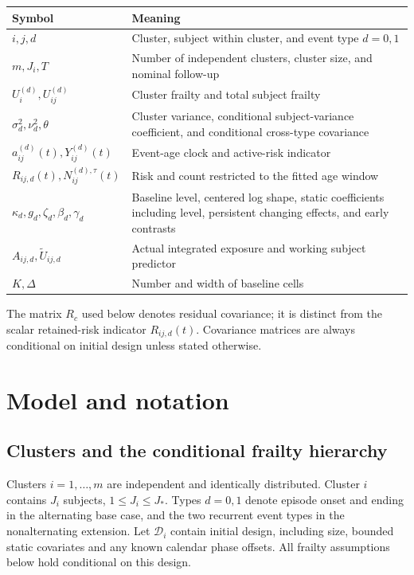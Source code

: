 \documentclass[11pt]{article}
\begin{document}
{\footnotesize\setlength{\tabcolsep}{4pt}
\begin{longtable}{P{95pt}P{357pt}}
\toprule
\textbf{Symbol} & \textbf{Meaning} \\
\midrule
\endhead
\bottomrule
\endlastfoot
\(i,j,d\) & Cluster, subject within cluster, and event type \(d=0,1\) \\
\(m,J_i,T\) & Number of independent clusters, cluster size, and nominal follow-up \\
\(U_i^{(d)},U_{ij}^{(d)}\) & Cluster frailty and total subject frailty \\
\(\sigma_d^2,\nu_d^2,\theta\) & Cluster variance, conditional subject-variance coefficient, and conditional cross-type covariance \\
\(a_{ij}^{(d)}(t),Y_{ij}^{(d)}(t)\) & Event-age clock and active-risk indicator \\
\(R_{ij,d}(t),N_{ij}^{(d),\tau}(t)\) & Risk and count restricted to the fitted age window \\
\(\kappa_d,g_d,\zeta_d,\beta_d,\gamma_d\) & Baseline level, centered log shape, static coefficients including level, persistent changing effects, and early contrasts \\
\(A_{ij,d},\widetilde U_{ij,d}\) & Actual integrated exposure and working subject predictor \\
\(K,\Delta\) & Number and width of baseline cells \\
\end{longtable}}

The matrix \(R_c\) used below denotes residual covariance; it is distinct from the scalar retained-risk indicator \(R_{ij,d}(t)\). Covariance matrices are always conditional on initial design unless stated otherwise.

\section{Model and notation}\label{sec:2}

\subsection{Clusters and the conditional frailty hierarchy}\label{sec:2.1}

Clusters \(i=1,\ldots,m\) are independent and identically distributed. Cluster \(i\) contains \(J_i\) subjects, \(1\leq J_i\leq J_*\). Types \(d=0,1\) denote episode onset and ending in the alternating base case, and the two recurrent event types in the nonalternating extension. Let \(\mathcal D_i\) contain initial design, including size, bounded static covariates and any known calendar phase offsets. All frailty assumptions below hold conditional on this design.
\end{document}
